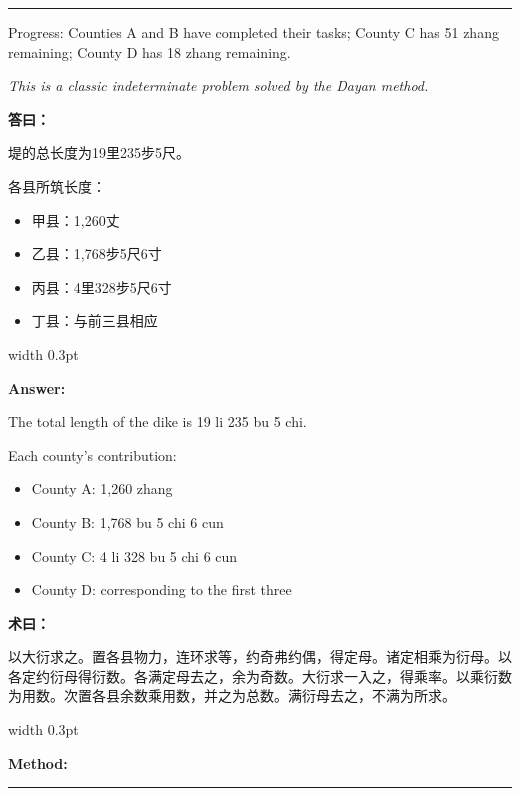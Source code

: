 \documentclass[10pt,a4paper]{article}
\newcommand{\cnlabel}[1]{\textcolor{labelcolor}{\textbf{#1}}}
\newcommand{\enlabel}[1]{\textcolor{labelcolor}{\textbf{#1}}}
\newenvironment{problemsection}{%
  \medskip\par\noindent\textcolor{rulecolor}{\rule{\textwidth}{0.4pt}}\par\smallskip%
}{\par\smallskip\noindent\textcolor{rulecolor}{\rule{\textwidth}{0.4pt}}\par\medskip}
\begin{document}
\begin{problemsection}
\begin{minipage}[t]{0.47\textwidth}
\begin{flushleft}
Progress: Counties A and B have completed their tasks; County C has 51 zhang remaining; County D has 18 zhang remaining.

\textit{This is a classic indeterminate problem solved by the Dayan method.}
\end{flushleft}
\end{minipage}

\vspace{0.3em}

\noindent\begin{minipage}[t]{0.47\textwidth}
\begin{flushleft}
\small
\cnlabel{答曰：}

堤的总长度为19里235步5尺。

各县所筑长度：
\begin{itemize}[leftmargin=*,nosep,topsep=2pt]
  \item 甲县：1,260丈
  \item 乙县：1,768步5尺6寸
  \item 丙县：4里328步5尺6寸
  \item 丁县：与前三县相应
\end{itemize}
\end{flushleft}
\end{minipage}%
\hfill\vrule width 0.3pt\hfill%
\begin{minipage}[t]{0.47\textwidth}
\begin{flushleft}
\small
\enlabel{Answer:}

The total length of the dike is 19 li 235 bu 5 chi.

Each county's contribution:
\begin{itemize}[leftmargin=*,nosep,topsep=2pt]
  \item County A: 1,260 zhang
  \item County B: 1,768 bu 5 chi 6 cun
  \item County C: 4 li 328 bu 5 chi 6 cun
  \item County D: corresponding to the first three
\end{itemize}
\end{flushleft}
\end{minipage}

\vspace{0.3em}

\noindent\begin{minipage}[t]{0.47\textwidth}
\begin{flushleft}
\small
\cnlabel{术曰：}

以大衍求之。置各县物力，连环求等，约奇弗约偶，得定母。诸定相乘为衍母。以各定约衍母得衍数。各满定母去之，余为奇数。大衍求一入之，得乘率。以乘衍数为用数。次置各县余数乘用数，并之为总数。满衍母去之，不满为所求。
\end{flushleft}
\end{minipage}%
\hfill\vrule width 0.3pt\hfill%
\begin{minipage}[t]{0.47\textwidth}
\begin{flushleft}
\small
\enlabel{Method:}


\end{flushleft}
\end{minipage}
\end{problemsection}
\end{document}
